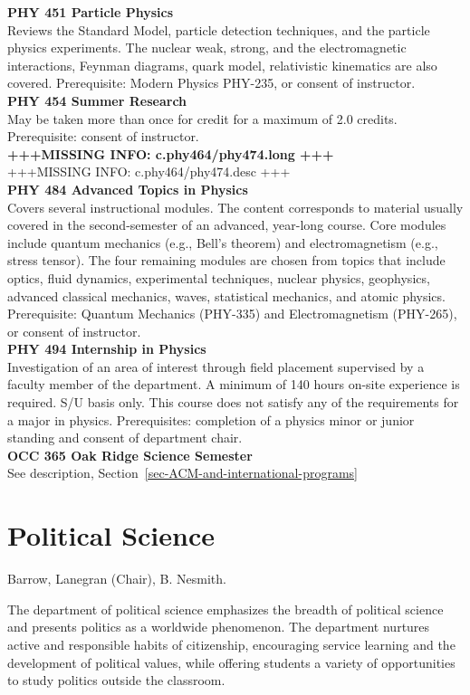 \documentclass[
  letterpaper,
]{scrbook}
\begin{document}
\textbf{PHY 451 Particle Physics}\\
Reviews the Standard Model, particle detection techniques, and the
particle physics experiments. The nuclear weak, strong, and the
electromagnetic interactions, Feynman diagrams, quark model,
relativistic kinematics are also covered. Prerequisite: Modern Physics
PHY-235, or consent of instructor.\\
\textbf{PHY 454 Summer Research}\\
May be taken more than once for credit for a maximum of 2.0 credits.
Prerequisite: consent of instructor.\\
\textbf{+++MISSING INFO: c.phy464/phy474.long +++}\\
+++MISSING INFO: c.phy464/phy474.desc +++\\
\textbf{PHY 484 Advanced Topics in Physics}\\
Covers several instructional modules. The content corresponds to
material usually covered in the second-semester of an advanced,
year-long course. Core modules include quantum mechanics (e.g., Bell's
theorem) and electromagnetism (e.g., stress tensor). The four remaining
modules are chosen from topics that include optics, fluid dynamics,
experimental techniques, nuclear physics, geophysics, advanced classical
mechanics, waves, statistical mechanics, and atomic physics.
Prerequisite: Quantum Mechanics (PHY-335) and Electromagnetism
(PHY-265), or consent of instructor.\\
\textbf{PHY 494 Internship in Physics}\\
Investigation of an area of interest through field placement supervised
by a faculty member of the department. A minimum of 140 hours on-site
experience is required. S/U basis only. This course does not satisfy any
of the requirements for a major in physics. Prerequisites: completion of
a physics minor or junior standing and consent of department chair.\\
\textbf{OCC 365 Oak Ridge Science Semester}\\
See description, Section~\ref{sec-ACM-and-international-programs}

\section{Political Science}\label{political-science}

Barrow, Lanegran (Chair), B. Nesmith.

The department of political science emphasizes the breadth of political
science and presents politics as a worldwide phenomenon. The department
nurtures active and responsible habits of citizenship, encouraging
service learning and the development of political values, while offering
students a variety of opportunities to study politics outside the
classroom.
\end{document}
